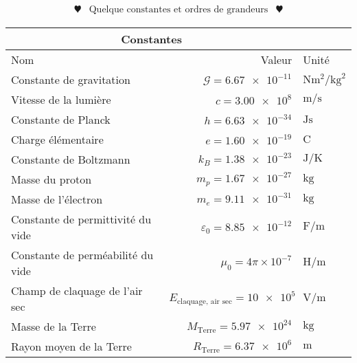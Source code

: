 \documentclass[10pt,a4paper,titlepage,landscape]{article}
\begin{document}
    \begin{tcolorbox}[colback=white,colframe=black]
        \[\begin{array}{lcr}  \varheartsuit &  \text{Quelque constantes et ordres de grandeurs} & \varheartsuit \end{array}\]
    \end{tcolorbox}

    \begin{table}[H]
            \centering
            \renewcommand{\arraystretch}{1.5} %
            \setlength{\tabcolsep}{8pt} %
            \begin{tabular}{@{}|l||r|l|}
                \multicolumn{2}{c}{Constantes} \\ \hline
                Nom & Valeur & Unité \\ \hline \hline
                Constante de gravitation & $\mathcal{G} = \num{6,67e-11} $ & $\unit{\newton\meter\squared\per\kilogram\squared}$ \\ \hline 
                Vitesse de la lumière & $c = \num{3,00e8} $ & $\unit{\meter\per\second}$ \\ \hline 
                Constante de Planck & $h = \num{6,63e-34} $ & $\unit{\joule\second}$ \\ \hline 
                Charge élémentaire & $e = \num{1,60e-19} $ & $\unit{\coulomb}$ \\ \hline 
                Constante de Boltzmann & $k_B = \num{1,38e-23} $ & $\unit{\joule\per\kelvin}$ \\ \hline 
                Masse du proton & $m_p = \num{1,67e-27} $ & $\unit{\kilogram}$ \\ \hline 
                Masse de l'électron & $m_e = \num{9,11e-31} $ & $\unit{\kilogram}$ \\ \hline 
                Constante de permittivité du vide & $\varepsilon_0 = \num{8,85e-12} $ & $\unit{\farad\per\meter}$ \\ \hline 
                Constante de perméabilité du vide & $\mu_0 = {4\pi\times 10^{-7}} $ & $\unit{\henry\per\meter}$ \\ \hline 
                Champ de claquage de l'air sec &$ E_{\text{claquage, air sec}} = \num{10e5} $ & $\unit{\volt\per\meter}$ \\ \hline
                Masse de la Terre & $M_\text{Terre} = \num{5,97e24} $ & $\unit{\kilogram}$ \\ \hline 
                Rayon moyen de la Terre & $R_\text{Terre} = \num{6,37e6} $ & $\unit{\meter}$ \\ \hline 

\end{tabular}
\end{table}
\end{document}
